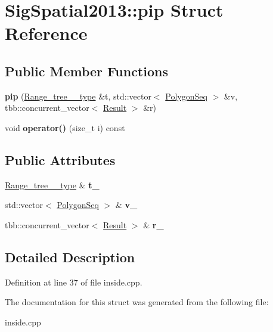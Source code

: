 \hypertarget{structSigSpatial2013_1_1pip}{\section{Sig\-Spatial2013\-:\-:pip Struct Reference}
\label{structSigSpatial2013_1_1pip}
}
\subsection*{Public Member Functions}
\begin{DoxyCompactItemize}
\item 
\hypertarget{structSigSpatial2013_1_1pip_a2617c5b63b0f13a36ed7bc322965f08c}{{\bfseries pip} (\hyperlink{namespaceSigSpatial2013_a1f24a632c09e5f10b138ef0096857e43}{Range\-\_\-tree\-\_\-\_\-type} \&t, std\-::vector$<$ \hyperlink{structSigSpatial2013_1_1PolygonSeq}{Polygon\-Seq} $>$ \&v, tbb\-::concurrent\-\_\-vector$<$ \hyperlink{namespaceSigSpatial2013_af3568b84c52aee7ab5aa8f15fb019d7f}{Result} $>$ \&r)}\label{structSigSpatial2013_1_1pip_a2617c5b63b0f13a36ed7bc322965f08c}

\item 
\hypertarget{structSigSpatial2013_1_1pip_a7311b3164f231c9e5bac2f125eddbf41}{void {\bfseries operator()} (size\-\_\-t i) const }\label{structSigSpatial2013_1_1pip_a7311b3164f231c9e5bac2f125eddbf41}

\end{DoxyCompactItemize}
\subsection*{Public Attributes}
\begin{DoxyCompactItemize}
\item 
\hypertarget{structSigSpatial2013_1_1pip_a3d863aeb56cae4b40fcae0a938a7eda5}{\hyperlink{namespaceSigSpatial2013_a1f24a632c09e5f10b138ef0096857e43}{Range\-\_\-tree\-\_\-\_\-type} \& {\bfseries t\-\_\-}}\label{structSigSpatial2013_1_1pip_a3d863aeb56cae4b40fcae0a938a7eda5}

\item 
\hypertarget{structSigSpatial2013_1_1pip_a847b2c5a84dd615e9ee3d8cd24766dc8}{std\-::vector$<$ \hyperlink{structSigSpatial2013_1_1PolygonSeq}{Polygon\-Seq} $>$ \& {\bfseries v\-\_\-}}\label{structSigSpatial2013_1_1pip_a847b2c5a84dd615e9ee3d8cd24766dc8}

\item 
\hypertarget{structSigSpatial2013_1_1pip_a9621d020ff65f6310aae5cd68929e3c1}{tbb\-::concurrent\-\_\-vector$<$ \hyperlink{namespaceSigSpatial2013_af3568b84c52aee7ab5aa8f15fb019d7f}{Result} $>$ \& {\bfseries r\-\_\-}}\label{structSigSpatial2013_1_1pip_a9621d020ff65f6310aae5cd68929e3c1}

\end{DoxyCompactItemize}


\subsection{Detailed Description}


Definition at line 37 of file inside.\-cpp.



The documentation for this struct was generated from the following file\-:\begin{DoxyCompactItemize}
\item 
inside.\-cpp\end{DoxyCompactItemize}
